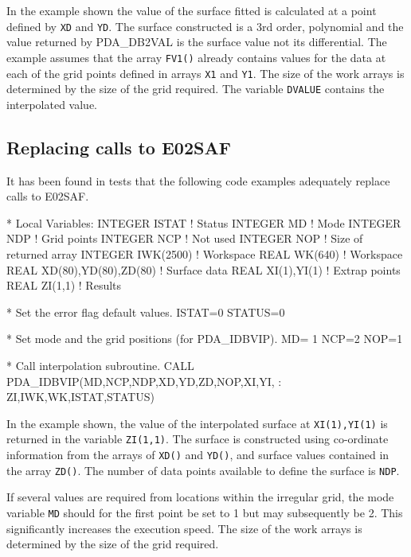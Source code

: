 \documentclass[11pt,twoside,nolof]{starlink}
\begin{document}
In the example shown the value of the surface fitted is
calculated at a point defined by \texttt{XD} and \texttt{YD}. The
surface constructed is a 3rd order, polynomial and the value
returned by PDA\_DB2VAL is the surface value not its differential.
The example assumes that the array \texttt{FV1()} already contains
values for the data at each of the grid points defined in
arrays \texttt{X1} and \texttt{Y1}. The size of the work arrays is
determined by the size of the grid required. The variable \texttt{DVALUE} contains the interpolated value.


\subsection{Replacing calls to E02SAF}

It has been found in tests that the following code examples adequately
replace calls to E02SAF.

\begin{terminalv}
*  Local Variables:
      INTEGER  ISTAT                   ! Status
      INTEGER  MD                      ! Mode
      INTEGER  NDP                     ! Grid points
      INTEGER  NCP                     ! Not used
      INTEGER  NOP                     ! Size of returned array
      INTEGER  IWK(2500)               ! Workspace
      REAL     WK(640)                 ! Workspace
      REAL     XD(80),YD(80),ZD(80)    ! Surface data
      REAL     XI(1),YI(1)             ! Extrap points
      REAL     ZI(1,1)                 ! Results


*   Set the error flag default values.
      ISTAT=0
      STATUS=0

*   Set mode and the grid positions (for PDA_IDBVIP).
      MD= 1
      NCP=2
      NOP=1

*   Call interpolation subroutine.
      CALL PDA_IDBVIP(MD,NCP,NDP,XD,YD,ZD,NOP,XI,YI,
     :                ZI,IWK,WK,ISTAT,STATUS)
\end{terminalv}

In the example shown, the value of the interpolated surface
at \texttt{XI(1),YI(1)} is returned in the variable \texttt{ZI(1,1)}.
The surface is constructed using
co-ordinate information from the arrays of \texttt{XD()} and \texttt{YD()},
and surface values contained in the array \texttt{ZD()}. The number
of data points available to define the surface is \texttt{NDP}.

If several values are required from locations within the
irregular grid, the mode variable \texttt{MD} should for the first
point be set to 1 but may subsequently be 2. This
significantly increases the execution speed. The size of the work
arrays is determined by the size of the grid required.
\end{document}
